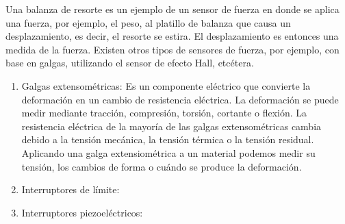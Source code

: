 \begin{enumerate}
			Una balanza de resorte es un ejemplo de un sensor de
			fuerza en donde se aplica una fuerza, por ejemplo, el peso, al platillo de balanza que causa un desplazamiento, es decir, el resorte se estira. El desplazamiento es entonces una medida de la fuerza. Existen otros tipos de sensores de fuerza, por ejemplo, con base en galgas, utilizando el sensor de efecto Hall, etcétera. \cite{saha2010robotics}\\
			\begin{enumerate}
				\item Galgas extensométricas: Es un componente eléctrico que convierte la deformación en un cambio de resistencia eléctrica. La deformación se puede medir mediante tracción, compresión, torsión, cortante o flexión. La resistencia eléctrica de la mayoría de las galgas extensométricas cambia debido a la tensión mecánica, la tensión térmica o la tensión residual. Aplicando una galga extensiométrica a un material podemos medir su tensión, los cambios de forma o cuándo se produce la deformación. \cite{Galgas}\\
				
				\item Interruptores de límite:
				
				\item Interruptores piezoeléctricos:
				
			\end{enumerate}
		\end{enumerate}
		
